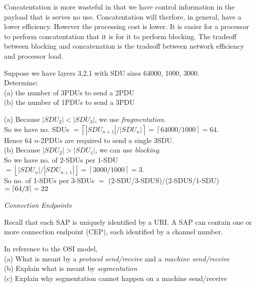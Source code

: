 Concatentation is more wasteful in that we have control 
information in the payload that is serves no use. Concatentation 
will therfore, in general, have a lower efficiency. However the processing cost is lower. 
It is easier for a processor to perform concatentation that it is 
for it to perform blocking. The tradeoff between blocking and concatenation 
is the tradeoff between network efficiency and processor load. 


\frmrule

\begin{example}
Suppose we have layers 3,2,1 with SDU sizes 64000, 1000, 3000. \\
Determine:\\
(a) the number of 3PDUs to send a 2PDU \\
(b) the number of 1PDUs to send a 3PDU

(a) Because $|SDU_2| < |SDU_3|$, we use \textit{fragmentation}. \\
So we have no. SDUs $= \left\lceil |SDU_{n+1}|/|SDU_{n}|\right\rceil = \left\lceil 64000/1000\right\rceil = 64$. \\
Hence 64 $n$-2PDUs are required to send a single 3SDU. \\
(b) Because $|SDU_2| > |SDU_1|$, we can use \textit{blocking}. \\
So we have no. of 2-SDUs per 1-SDU $= \left\lfloor |SDU_{n}|/|SDU_{n+1}|\right\rfloor = \left\lceil 3000/1000\right\rceil = 3$. \\
So no. of 1-SDUs per 3-SDUs $=$ (2-SDU/3-SDUS)$/$(2-SDUS/1-SDU) $=\lceil64/3\rceil = 22$
\end{example}


\frmrule

\textit{Connection Endpoints}

Recall that each SAP is uniquely identified by a URI. 
A SAP can contain one or more connection endpoint (CEP), each identiﬁed by a
channel number.

\frmrule

\begin{example}
In reference to the OSI model,\\
(a) What is meant by a \textit{protocol send/receive} and a \textit{machine send/receive} \\
(b) Explain what is meant by \textit{segmentation}\\
(c) Explain why segmentation cannot happen on a machine send/receive
\end{example}